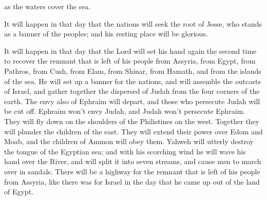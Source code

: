 {\par }{\QB as the waters cover the sea.
\par }{\BB \par }{\PP {}It will happen in that day that the nations will seek the root of Jesse, who stands as a banner of the peoples; and his resting place will be glorious.
\par }{\PP {}It will happen in that day that the Lord will set his hand again the second time to recover the remnant that is left of his people from Assyria, from Egypt, from Pathros, from Cush, from Elam, from Shinar, from Hamath, and from the islands of the sea.
He will set up a banner for the nations, and will assemble the outcasts of Israel, and gather together the dispersed of Judah from the four corners of the earth.
The envy also of Ephraim will depart, and those who persecute Judah will be cut off. Ephraim won’t envy Judah, and Judah won’t persecute Ephraim.
They will fly down on the shoulders of the Philistines on the west. Together they will plunder the children of the east. They will extend their power over Edom and Moab, and the children of Ammon will obey them.
Yahweh will utterly destroy the tongue of the Egyptian sea; and with his scorching wind he will wave his hand over the River, and will split it into seven streams, and cause men to march over in sandals.
There will be a highway for the remnant that is left of his people from Assyria, like there was for Israel in the day that he came up out of the land of Egypt.

\par }
